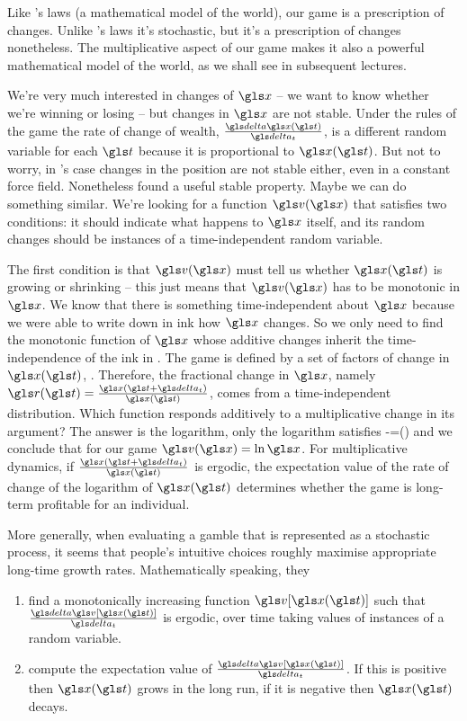 Like 's laws (a mathematical model of the world), our game is a prescription of changes. 
Unlike 's laws it's stochastic, but it's a prescription of changes nonetheless. 
The multiplicative aspect of our game makes it also a powerful mathematical model of the world, as we shall see in subsequent lectures. 

We're very much interested in changes of $\x$ -- we want to know 
whether we're winning or losing -- but changes in $\x$ are not stable. 
Under the rules of the game the rate of change of wealth, $\frac{\d \x(\t)}{\dt}$, is a different 
random variable for each $\t$ because it is proportional to $\x(\t)$. But not to worry, 
in 's case changes in the position are not stable either, even in a 
constant force field. Nonetheless  found a useful stable property. 
Maybe we can do something similar. We're looking for a function $\gv(\x)$ that satisfies two conditions: 
it should indicate what happens to $\x$ itself, and its random changes should be instances of a time-independent random variable.

The first condition is that $\gv(\x)$ must tell us 
whether $\x(\t)$ is growing or shrinking -- this just means that $\gv(\x)$ has to 
be monotonic in $\x$. We know that there is something time-independent
about $\x$ because we were able to write down in ink how $\x$ changes. So we only need 
to find the monotonic function of $\x$ whose additive changes inherit the time-independence 
of the ink in . The game is defined by a set of factors of change in $\x(\t)$, . 
Therefore, the fractional change in $\x$, namely
$\gr(\t) = \frac{\x(\t+\dt)}{\x(\t)}$, comes from a time-independent distribution. Which 
function responds additively to a multiplicative change in its argument? 
The answer is the logarithm, \ie
only the logarithm satisfies
\be
\gv[\x(\t+\dt)]-\gv[\x(\t)]=\gv \left(\frac{\x(\t+\dt)}{\x(\t)}\right)
\ee
and we conclude that for our game $\gv(\x)=\ln\x$.
For multiplicative dynamics, \ie if $\frac{\x(\t+\dt)}{\x(\t)}$ is ergodic, the expectation 
value of the rate of change of the logarithm of $\x(\t)$ determines whether the game is long-term profitable 
for an individual.

More generally, when evaluating a gamble that is represented as a stochastic process, it seems that people's intuitive
choices roughly maximise appropriate long-time growth rates.
Mathematically speaking, they
\begin{enumerate}
\item
find a monotonically increasing function $\gv[\x(\t)]$ such that $\frac{\d \gv[\x(\t)]}{\dt}$ 
is ergodic, over time taking values of instances of a random variable.
\item
compute the expectation value of $\frac{\d \gv[\x(\t)]}{\dt}$. If this is positive then $\x(\t)$
grows in the long run, if it is negative then $\x(\t)$ decays.
\end{enumerate}


